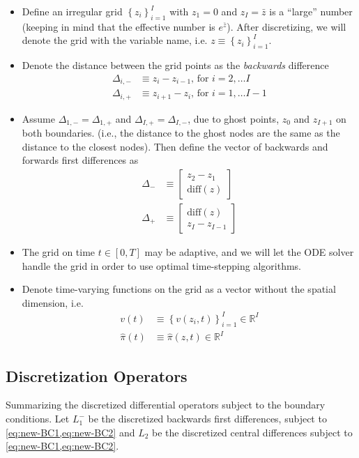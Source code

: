 \documentclass[11pt]{article}
\newcommand{\R}{\ensuremath{\mathbb{R}}}
\newcommand{\set}[1]{\ensuremath{\left\{{#1}\right\}}}
\begin{document}
\begin{itemize}
	\item Define an irregular  grid $\set{z_i}_{i=1}^I$ with $z_1 = 0$ and $z_I = \bar{z}$ is a ``large'' number (keeping in mind that the effective number is $e^{\bar{z}}$).  After discretizing, we will denote the grid with the variable name, i.e. $z \equiv \set{z_i}_{i=1}^I$.
	\item Denote the distance between the grid points as the \textit{backwards} difference
	\begin{align}
	\Delta_{i,-} &\equiv z_i - z_{i-1},\, \text{for } i = 2,\ldots I\\
	\Delta_{i,+} &\equiv z_{i+1} - z_i,\, \text{for } i = 1,\ldots I-1
	\end{align}
	\item Assume $\Delta_{1, -} = \Delta_{1, +}$ and $\Delta_{I, +} = \Delta_{I, -}$, due to ghost points, $z_0$ and $z_{I+1}$ on both boundaries. (i.e., the distance to the ghost nodes are the same as the distance to the closest nodes).  Then define the vector of backwards and forwards first differences as
	\begin{align}
	\Delta_{-} &\equiv \begin{bmatrix} z_2 - z_1 \\
	\text{diff}(z)
	\end{bmatrix}\\
	\Delta_{+} &\equiv \begin{bmatrix} \text{diff}(z)\\
	z_I - z_{I-1}
	\end{bmatrix}
	\end{align}
	\item The grid on time $t \in [0,T]$ may be adaptive, and we will let the ODE solver handle the grid in order to use optimal time-stepping algorithms.
	\item Denote time-varying functions on the grid as a vector without the spatial dimension, i.e. 
	\begin{align}
	v(t) &\equiv \set{v(z_i, t)}_{i=1}^I\in\R^I\\
	\hat{\pi}(t) &\equiv	\hat{\pi}(z,t) \in \R^I
	\end{align}
\end{itemize}

\subsection{Discretization Operators}\label{sec:discretization-operators}
Summarizing the discretized differential operators subject to the boundary conditions.  Let $L_1^{-}$ be the discretized backwards first differences, subject to \cref{eq:new-BC1,eq:new-BC2} and $L_2$ be the discretized central differences subject to \cref{eq:new-BC1,eq:new-BC2}.
\end{document}
